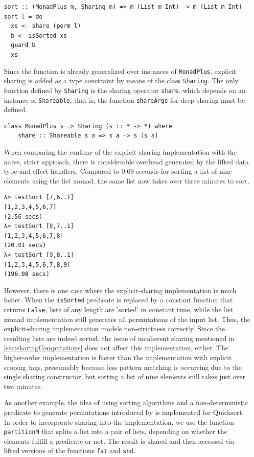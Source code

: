 \documentclass[a4paper, 11pt, fleqn, twoside]{scrreprt}
\newcommand{\hinl}[1]{\texttt{#1}}
\begin{document}
\begin{verbatim}
sort :: (MonadPlus m, Sharing m) => m (List m Int) -> m (List m Int)
sort l = do
  xs <- share (perm l)
  b <- isSorted xs
  guard b
  xs
\end{verbatim}

Since the function is already generalized over instances of \hinl{MonadPlus}, explicit sharing is added as a type constraint by means of the class \hinl{Sharing}.
The only function defined by \hinl{Sharing} is the sharing operator \hinl{share}, which depends on an instance of \hinl{Shareable}, that is, the function \hinl{shareArgs} for deep sharing must be defined.

\begin{verbatim}
class MonadPlus s => Sharing (s :: * -> *) where
    share :: Shareable s a => s a -> s (s a)
\end{verbatim}

When comparing the runtime of the explicit sharing implementation with the naive, strict approach, there is considerable overhead generated by the lifted data type and effect handlers.
Compared to 0.69 seconds for sorting a list of nine elements using the list monad, the same list now takes over three minutes to sort.

\begin{verbatim}
λ> testSort [7,6..1]
[1,2,3,4,5,6,7]
(2.56 secs)
λ> testSort [8,7..1]
[1,2,3,4,5,6,7,8]
(20.01 secs)
λ> testSort [9,8..1]
[1,2,3,4,5,6,7,8,9]
(196.08 secs)
\end{verbatim}

However, there is one case where the explicit-sharing implementation is much faster.
When the \hinl{isSorted} predicate is replaced by a constant function that returns \hinl{False}, lists of any length are 'sorted' in constant time, while the list monad implementation still generates all permutations of the input list.
Thus, the explicit-sharing implementation models non-strictness correctly.
Since the resulting lists are indeed sorted, the issue of incoherent sharing mentioned in \autoref{sec:sharingComputations} does not affect this implementation, either.
The higher-order implementation is faster than the implementation with explicit scoping tags, presumably because less pattern matching is occurring due to the single sharing constructor, but sorting a list of nine elements still takes just over two minutes.

As another example, the idea of using sorting algorithms and a non-deterministic predicate to generate permutations introduced by \citet{Christiansen2016allsorts} is implemented for Quicksort.
In order to incorporate sharing into the implementation, we use the function \hinl{partitionM} that splits a list into a pair of lists, depending on whether the elements fulfill a predicate or not.
The result is shared and then accessed via lifted versions of the functions \hinl{fst} and \hinl{snd}.
\end{document}
